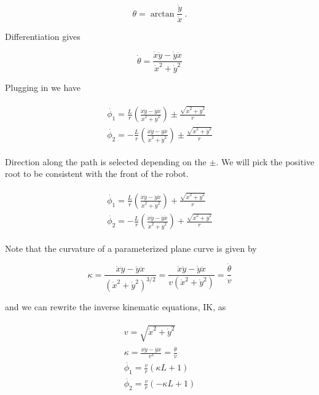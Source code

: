 \[\theta = \arctan \frac{\dot{y}}{\dot{x}}~.\]

Differentiation gives

\[\dot{\theta} = \frac{\dot{x}\ddot{y} - \dot{y}\ddot{x}}{\dot{x}^2 + \dot{y}^2}\]

Plugging in we have

\[\begin{aligned}
\begin{array}{l}
\dot{\phi_1} = \displaystyle \frac{L}{r}\left( \frac{\dot{x}\ddot{y} - \dot{y}\ddot{x}}{\dot{x}^2 + \dot{y}^2}\right) \pm \frac{\sqrt{\dot{x}^2 + \dot{y}^2}}{r} \\[3mm]
\dot{\phi_2} = \displaystyle -\frac{L}{r}\left(\frac{\dot{x}\ddot{y} - \dot{y}\ddot{x}}{\dot{x}^2 + \dot{y}^2}\right) \pm \frac{\sqrt{\dot{x}^2 + \dot{y}^2}}{r}
\end{array}
\end{aligned}\]

Direction along the path is selected depending on the \(\pm\). We will
pick the positive root to be consistent with the front of the robot.

\[\begin{aligned}
\boxed{
\begin{array}{l}
\dot{\phi_1} = \displaystyle \frac{L}{r}\left( \frac{\dot{x}\ddot{y} - \dot{y}\ddot{x}}{\dot{x}^2 + \dot{y}^2}\right) + \frac{\sqrt{\dot{x}^2 + \dot{y}^2}}{r} \\[3mm]
\dot{\phi_2} = \displaystyle -\frac{L}{r}\left(\frac{\dot{x}\ddot{y} - \dot{y}\ddot{x}}{\dot{x}^2 + \dot{y}^2}\right) + \frac{\sqrt{\dot{x}^2 + \dot{y}^2}}{r}
\end{array} }
\end{aligned}\]

Note that the curvature of a parameterized plane curve is given by

\[\kappa   = \frac{\dot{x}\ddot{y} - \dot{y}\ddot{x}}{(\dot{x}^2 + \dot{y}^2)^{3/2}}
= \frac{\dot{x}\ddot{y} - \dot{y}\ddot{x}}{v(\dot{x}^2 + \dot{y}^2)} =  \frac{\dot{\theta}}{v}\]

and we can rewrite the inverse kinematic equations, IK, as

\[\begin{aligned}
\boxed{
\begin{array}{l}
v = \sqrt{\dot{x}^2 + \dot{y}^2}\\[3mm]
\kappa =   \displaystyle  \frac{\dot{x}\ddot{y} - \dot{y}\ddot{x}}{v^3} = \frac{\dot{\theta}}{v}\\[3mm]
\dot{\phi_1} = \displaystyle \frac{v}{r}\left(\kappa L + 1\right) \\[3mm]
\dot{\phi_2} = \displaystyle \frac{v}{r}\left(-\kappa L + 1\right)
\end{array}}
\end{aligned}\]

